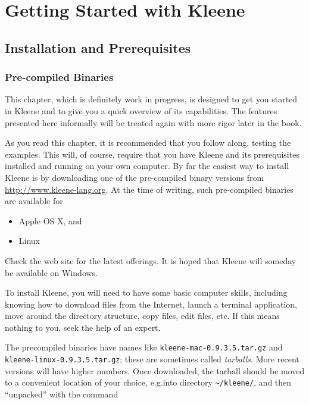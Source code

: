\chapter{Getting Started with Kleene}

\section{Installation and Prerequisites}

\subsection{Pre-compiled Binaries}

This chapter, which is definitely work in progress, is designed to get
you started in Kleene and to give you a quick overview of its capabilities.
The features presented here informally will be treated again with 
more rigor later in the book.

As you read this chapter, it is recommended that you follow along, testing
the examples.  This will, of course, require that you have Kleene and its
prerequisites installed and running on your own computer.  By far the
easiest way to install Kleene is by downloading one of the pre-compiled
binary versions from \url{http://www.kleene-lang.org}.  At the time of
writing, such pre-compiled binaries are available for

\begin{itemize}
\item
Apple OS X, and
\item
Linux
\end{itemize}

\noindent
Check the web site for the latest offerings.  
It is hoped that Kleene will someday be available on Windows.

To install Kleene, you will need to have some basic computer skills, including knowing how
to
download files from the Internet,
launch a terminal application, move around the directory structure,
copy files, edit files, etc.  If this means nothing to you, seek the
help of an expert.

The precompiled binaries have names like \texttt{kleene-mac-0.9.3.5.tar.gz} and
\texttt{kleene-linux-0.9.3.5.tar.gz}; these are sometimes called \emph{tarballs}.  More recent
versions will have higher numbers.  Once downloaded, the tarball should be moved
to a convenient location of your choice, e.g.\@ into directory 
\texttt{\~{}/kleene/}, and then
``unpacked'' with the command

